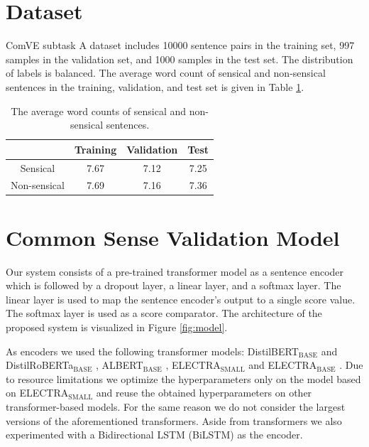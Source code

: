\documentclass[10pt, a4paper]{article}
\begin{document}
\section{Dataset}
\label{data}
ComVE subtask A dataset includes 10000 sentence pairs in the training set, 997 samples in the validation set, and 1000 samples in the test set. The distribution of labels is balanced. The average word count of sensical and non-sensical sentences in the training, validation, and test set is given in Table \ref{lengths}.
\begin{table}[]
    \caption{The average word counts of sensical and non-sensical sentences.}

    \begin{center}
    \begin{tabular}{cccc}
        \toprule
        & Training & Validation & Test\\
        \midrule
        Sensical & 7.67 & 7.12 & 7.25\\
        Non-sensical & 7.69 & 7.16 & 7.36 \\
        \bottomrule
    \end{tabular}
    
    \end{center}

    \label{lengths}
\end{table}

\section{Common Sense Validation Model} 
\label{model}
Our system consists of a pre-trained transformer model as a sentence encoder which is followed by a dropout layer, a linear layer, and a softmax layer. The linear layer is used to map the sentence encoder's output to a single score value. The softmax layer is used as a score comparator. The architecture of the proposed system is visualized in Figure \ref{fig:model}.

As encoders we used the following transformer models: DistilBERT$_{\text{BASE}}$ and DistilRoBERTa$_{\text{BASE}}$ \citep{distil-bert}, ALBERT$_{\text{BASE}}$ \citep{albert}, ELECTRA$_{\text{SMALL}}$ and ELECTRA$_{\text{BASE}}$ \citep{electra}. Due to resource limitations we optimize the hyperparameters only on the model based on ELECTRA$_{\text{SMALL}}$ and reuse the obtained hyperparameters on other transformer-based models. For the same reason we do not consider the largest versions of the aforementioned transformers. Aside from transformers we also experimented with a Bidirectional LSTM (BiLSTM) \citep{schuster1997bilstm} as the encoder.
\end{document}
